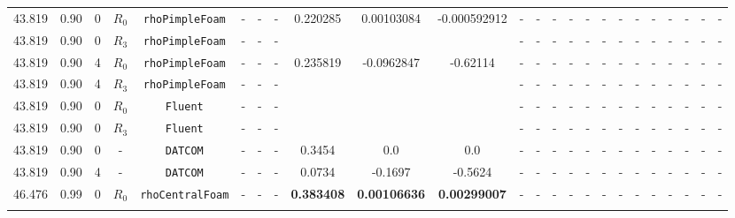 \documentclass[12pt]{article}
\begin{document}
\begin{table}[H]
{\begin{tabular}{ccccc|ccc|ccc|ccc|ccc|ccccccc}
        \rowcolor{blue!10}
        43.819 & 0.90& 0 & $R_0$ & \texttt{rhoPimpleFoam} & - & - & - & 0.220285  & 0.00103084 & -0.000592912 & - & - & - & - & - & - & - & - & - & - & - & - & - \\
        \rowcolor{blue!40}
        43.819 & 0.90 & 0 & $R_3$ & \texttt{rhoPimpleFoam} & - & - & - &  &  & & - & - & - & - & - & - & - & - & - & - & - & - & - \\ 
        \rowcolor{blue!10}
        43.819 & 0.90& 4 & $R_0$ & \texttt{rhoPimpleFoam} & - & - & - & 0.235819 & -0.0962847 & -0.62114 & - & - & - & - & - & - & - & - & - & - & - & - & - \\
        \rowcolor{blue!40}
        43.819 & 0.90& 4 & $R_3$ & \texttt{rhoPimpleFoam} & - & - & - &  &  & & - & - & - & - & - & - & - & - & - & - & - & - & - \\ 
        \rowcolor{red!10}
        43.819 & 0.90 & 0 & $R_0$ & \texttt{Fluent} & - & - & - &  &  &  & - & - & - & - & - & - & - & - & - & - & - & - & - \\ 
        \rowcolor{red!40}
        43.819 & 0.90 & 0 & $R_3$ & \texttt{Fluent} & - & - & - &  &  &  & - & - & - & - & - & - & - & - & - & - & - & - & - \\ 
        \rowcolor{gray!10}
        43.819 & 0.90 & 0 & - & \texttt{DATCOM} & - & - & - & 0.3454& 0.0 & 0.0 & - & - & - & - & - & - & - & - & - & - & - & - & - \\
        \rowcolor{gray!10}
        43.819 & 0.90 & 4 & - & \texttt{DATCOM} & - & - & - & 0.0734 & -0.1697 & -0.5624 & - & - & - & - & - & - & - & - & - & - & - & - & - \\ \hline 
        \rowcolor{green!10}
        46.476 &  0.99 & 0 & $R_0$ & \texttt{rhoCentralFoam} & - & - & - & \textbf{0.383408} & \textbf{0.00106636} & \textbf{0.00299007} & - & - & - & - & - & - & - & - & - & - & - & - & - \\  
        \rowcolor{green!20}

\end{tabular}}
\end{table}
\end{document}
